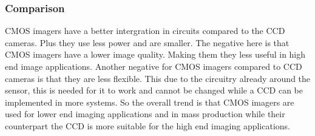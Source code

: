 \documentclass{article}
\begin{document}
\subsubsection{Comparison}

CMOS imagers have a better intergration in circuits compared to the CCD cameras. Plus they use less power and are smaller. The negative here is that CMOS imagers have a lower image quality. Making them they less useful in high end image applications. Another negative for CMOS imagers compared to CCD cameras is that they are less flexible. This due to the circuitry already around the sensor, this is needed for it to work and cannot be changed while a CCD can be implemented in more systems. So the overall trend is that CMOS   imagers are used for lower end imaging applications and in mass production while their counterpart the CCD is more suitable for the high end imaging applications.
\end{document}
